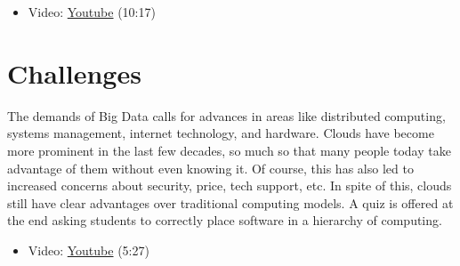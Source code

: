 \begin{itemize}
\tightlist
\item
  Video: \href{https://www.youtube.com/watch?v=_irz3v1gT-A}{Youtube}
  (10:17)
\end{itemize}

\section{Challenges}\label{challenges}

The demands of Big Data calls for advances in areas like distributed
computing, systems management, internet technology, and hardware. Clouds
have become more prominent in the last few decades, so much so that many
people today take advantage of them without even knowing it. Of course,
this has also led to increased concerns about security, price, tech
support, etc. In spite of this, clouds still have clear advantages over
traditional computing models. A quiz is offered at the end asking
students to correctly place software in a hierarchy of computing.

\begin{itemize}
\tightlist
\item
  Video: \href{https://www.youtube.com/watch?v=VpDRGcBe4s8}{Youtube}
  (5:27)
\end{itemize}
